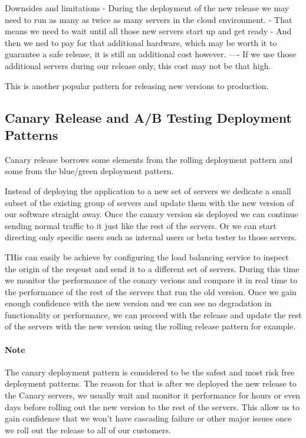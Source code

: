 \documentclass[a4paper, 11pt]{book}
\begin{document}
    Downsides and limitations
    - During the deployment of the new release we may need to run as many as twice as many servers in the cloud environment.
    - That means we need to wait until all those new servers start up and get ready
    - And then we ned to pay for that additional hardware, which may be worth it to guarantee a safe release, it is still an additional cost however.
    ---- If we use those additional servers during our release only, this cost may not be that high.

    This is another popular pattern for releasing new versions to production.

    \subsection{Canary Release and A/B Testing Deployment Patterns}
    Canary release borrows some elements from the rolling deployment pattern and some from the blue/green deployment pattern.

    Instead of deploying the application to a new set of servers we dedicate a small subset of the existing group of servers and update them with the new version of our software straight away.
    Once the canary version sis deployed we can continue sending normal traffic to it just like the rest of the servers.
    Or we can start directing only specific users such as internal users or beta tester to those servers.

    THis can easily be achieve by configuring the load balancing service to inspect the origin of the reqeust and send it to a different set of servers.
    During this time we monitor the performance of the conary verions and compare it in real time to the performance of the rest of the servers that run the old version.
    Once we gain enough confidence with the new version and we can see no degradation in functionality or performance, we can proceed with the release and update the rest of the servers with the new version using the rolling release pattern for example.

    \paragraph{Note} The canary deployment pattern is considered to be the safest and most risk free deployment patterns.
    The reason for that is after we deployed the new release to the Canary servers, we usually wait and monitor it performance for hours or even days before rolling out the new version to the rest of the servers.
    This allow us to gain confidence that we won't have cascading failure or other major issues once we roll out the release to all of our customers.
\end{document}
